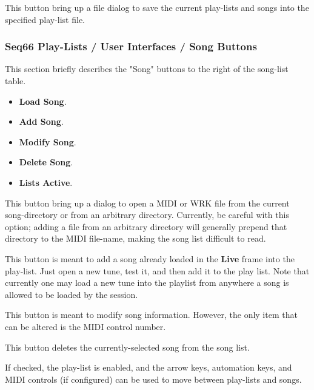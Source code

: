   This button bring up a file dialog to save the current play-lists and songs
   into the specified play-list file.

\subsubsection{Seq66 Play-Lists / User Interfaces / Song Buttons}
\label{subsubsec:playlist_ui_song_buttons}

   This section briefly describes the "Song" buttons to the right of the
   song-list table.

   \begin{itemize}
      \item \textbf{Load Song}.
      \item \textbf{Add Song}.
      \item \textbf{Modify Song}.
      \item \textbf{Delete Song}.
      \item \textbf{Lists Active}.
   \end{itemize}

   \setcounter{ItemCounter}{0}      %

   This button bring up a dialog to open a MIDI or WRK file from
   the current song-directory or from an arbitrary directory.
   Currently, be careful with this option; adding a file from an arbitrary
   directory will generally prepend that directory to the MIDI file-name,
   making the song list difficult to read.

   This button is meant to add a song already loaded in the \textbf{Live} frame
   into the play-list.  Just open a new tune, test it, and then add it to the
   play list.  Note that currently one may load a new tune into the playlist
   from anywhere a song is allowed to be loaded by the session.

   This button is meant to modify song information.  However, the only item
   that can be altered is the MIDI control number.

   This button deletes the currently-selected song from the song list.

   If checked, the play-list is enabled, and the arrow keys, automation keys,
   and MIDI controls (if configured) can be used to move between play-lists and
   songs.


